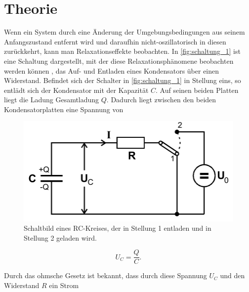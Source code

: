 \section{Theorie}
\label{sec:Theorie}




Wenn ein System durch eine Änderung der Umgebungsbedingungen aus seinem Anfangszustand entfernt wird und daraufhin nicht-oszillatorisch in diesen zurückkehrt, kann man Relaxationseffekte beobachten. In \autoref{fig:schaltung_1} ist eine Schaltung dargestellt, mit der diese Relaxationsphänomene beobachten werden können , das Auf- und Entladen eines Kondensators über einen Widerstand. 
Befindet sich der Schalter in \autoref{fig:schaltung_1} in Stellung eins, so entlädt sich der Kondensator mit der Kapazität $C$. Auf seinen beiden Platten liegt die Ladung Gesamtladung $Q$. Dadurch liegt zwischen den beiden Kondensatorplatten eine Spannung von 

\begin{figure}
    \centering
    \includegraphics[width=\textwidth/2]{images/schaltung_1.png}
    \caption{Schaltbild eines RC-Kreises, der in Stellung 1 entladen und in Stellung 2 geladen wird. \cite{V353}}
    \label{fig:schaltung_1}
\end{figure}

\begin{equation}
    \label{eq:kondensatorspannung}
    U_C = \frac{Q}{C}.
\end{equation}

Durch das ohmsche Gesetz ist bekannt, dass durch diese Spannung $U_C$ und den Widerstand $R$ ein Strom 


